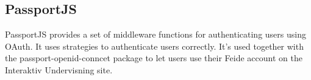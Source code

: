 \subsection{PassportJS}
PassportJS\cite{passportjs} provides a set of middleware functions for authenticating users using OAuth\cite{oauth}. It uses strategies to authenticate users correctly. It's used together with the passport-openid-conncet\cite{passportopenidconnect} package to let users use their Feide\cite{feide} account on the Interaktiv Undervisning site.




